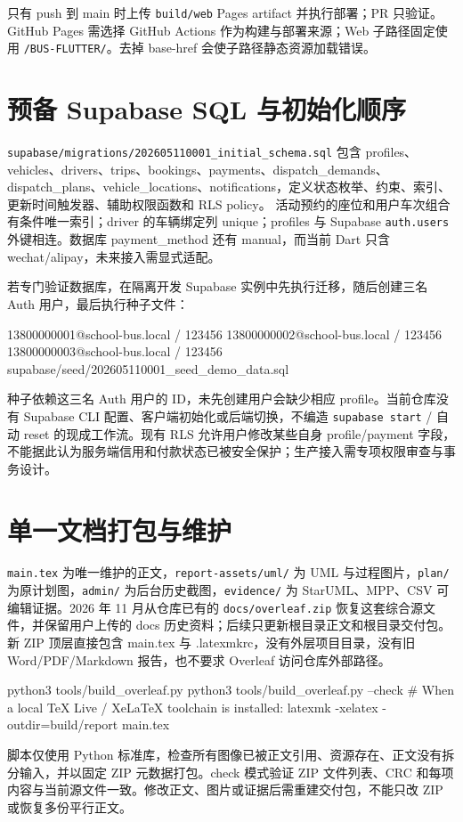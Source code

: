 \documentclass[UTF8,fontset=fandol,zihao=-4,oneside]{ctexrep}
\newcommand{\pathcode}[1]{\nolinkurl{#1}}
\begin{document}
只有 push 到 main 时上传 \pathcode{build/web} Pages artifact 并执行部署；PR 只验证。GitHub Pages 需选择 GitHub Actions 作为构建与部署来源；Web 子路径固定使用 \texttt{/BUS-FLUTTER/}。去掉 base-href 会使子路径静态资源加载错误。

\section{预备 Supabase SQL 与初始化顺序}
\pathcode{supabase/migrations/202605110001_initial_schema.sql} 包含 profiles、vehicles、drivers、trips、bookings、payments、dispatch\_demands、dispatch\_plans、vehicle\_locations、notifications，定义状态枚举、约束、索引、更新时间触发器、辅助权限函数和 RLS policy。
活动预约的座位和用户车次组合有条件唯一索引；driver 的车辆绑定列 unique；profiles 与 Supabase \texttt{auth.users} 外键相连。数据库 payment\_method 还有 manual，而当前 Dart 只含 wechat/alipay，未来接入需显式适配。

若专门验证数据库，在隔离开发 Supabase 实例中先执行迁移，随后创建三名 Auth 用户，最后执行种子文件：
\begin{code}
13800000001@school-bus.local / 123456
13800000002@school-bus.local / 123456
13800000003@school-bus.local / 123456
supabase/seed/202605110001_seed_demo_data.sql
\end{code}
种子依赖这三名 Auth 用户的 ID，未先创建用户会缺少相应 profile。当前仓库没有 Supabase CLI 配置、客户端初始化或后端切换，不编造 \texttt{supabase start} / 自动 reset 的现成工作流。现有 RLS 允许用户修改某些自身 profile/payment 字段，不能据此认为服务端信用和付款状态已被安全保护；生产接入需专项权限审查与事务设计。

\section{单一文档打包与维护}
\texttt{main.tex} 为唯一维护的正文，\texttt{report-assets/uml/} 为 UML 与过程图片，\texttt{plan/} 为原计划图，\texttt{admin/} 为后台历史截图，\texttt{evidence/} 为 StarUML、MPP、CSV 可编辑证据。2026 年 11 月从仓库已有的 \pathcode{docs/overleaf.zip} 恢复这套综合源文件，并保留用户上传的 docs 历史资料；后续只更新根目录正文和根目录交付包。新 ZIP 顶层直接包含 main.tex 与 .latexmkrc，没有外层项目目录，没有旧 Word/PDF/Markdown 报告，也不要求 Overleaf 访问仓库外部路径。

\begin{code}
python3 tools/build_overleaf.py
python3 tools/build_overleaf.py --check
# When a local TeX Live / XeLaTeX toolchain is installed:
latexmk -xelatex -outdir=build/report main.tex
\end{code}
脚本仅使用 Python 标准库，检查所有图像已被正文引用、资源存在、正文没有拆分输入，并以固定 ZIP 元数据打包。check 模式验证 ZIP 文件列表、CRC 和每项内容与当前源文件一致。修改正文、图片或证据后需重建交付包，不能只改 ZIP 或恢复多份平行正文。
\end{document}
